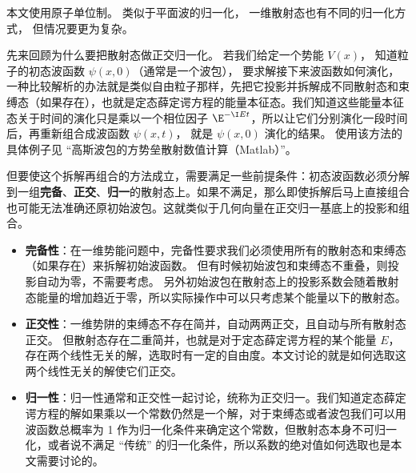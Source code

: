 


本文使用原子单位制。 类似于平面波的归一化， 一维散射态也有不同的归一化方式， 但情况要更为复杂。

先来回顾为什么要把散射态做正交归一化。 若我们给定一个势能 $V(x)$， 知道粒子的初态波函数 $\psi(x, 0)$（通常是一个波包）， 要求解接下来波函数如何演化，一种比较解析的办法就是类似自由粒子那样，先把它投影并拆解成不同散射态和束缚态（如果存在），也就是定态薛定谔方程的能量本征态。我们知道这些能量本征态关于时间的演化只是乘以一个相位因子 $\E^{-\I Et}$，所以让它们分别演化一段时间后，再重新组合成波函数 $\psi(x, t)$， 就是 $\psi(x, 0)$ 演化的结果。 使用该方法的具体例子见 “高斯波包的方势垒散射数值计算（Matlab）”。

但要使这个拆解再组合的方法成立，需要满足一些前提条件：初态波函数必须分解到一组\textbf{完备}、\textbf{正交}、\textbf{归一}的散射态上。如果不满足，那么即使拆解后马上直接组合也可能无法准确还原初始波包。这就类似于几何向量在正交归一基底上的投影和组合。

\begin{itemize}
\item \textbf{完备性}：在一维势能问题中，完备性要求我们必须使用所有的散射态和束缚态（如果存在）来拆解初始波函数。 但有时候初始波包和束缚态不重叠，则投影自动为零，不需要考虑。 另外初始波包在散射态上的投影系数会随着散射态能量的增加趋近于零，所以实际操作中可以只考虑某个能量以下的散射态。
\item \textbf{正交性}：一维势阱的束缚态不存在简并，自动两两正交，且自动与所有散射态正交。 但散射态存在二重简并，也就是对于定态薛定谔方程的某个能量 $E$，存在两个线性无关的解，选取时有一定的自由度。本文讨论的就是如何选取这两个线性无关的解使它们正交。
\item \textbf{归一性}：归一性通常和正交性一起讨论，统称为正交归一。我们知道定态薛定谔方程的解如果乘以一个常数仍然是一个解，对于束缚态或者波包我们可以用波函数总概率为 1 作为归一化条件来确定这个常数，但散射态本身不可归一化，或者说不满足 “传统” 的归一化条件，所以系数的绝对值如何选取也是本文需要讨论的。
\end{itemize}

